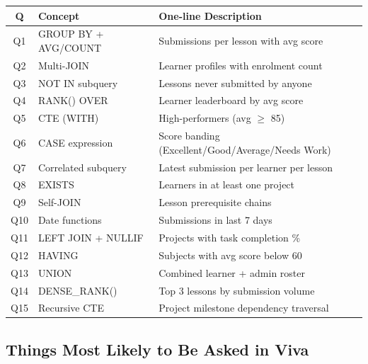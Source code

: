 \documentclass[11pt,a4paper]{article}
\begin{document}
\begin{center}
\renewcommand{\arraystretch}{1.1}
\begin{tabular}{@{}cll@{}}
\toprule
\rowcolor{tableheadbg}
{\color{white}\textbf{Q}} &
{\color{white}\textbf{Concept}} &
{\color{white}\textbf{One-line Description}} \\
\midrule
\rowcolor{tablerowbg} Q1  & GROUP BY + AVG/COUNT & Submissions per lesson with avg score \\
Q2  & Multi-JOIN          & Learner profiles with enrolment count \\
\rowcolor{tablerowbg} Q3  & NOT IN subquery     & Lessons never submitted by anyone \\
Q4  & RANK() OVER         & Learner leaderboard by avg score \\
\rowcolor{tablerowbg} Q5  & CTE (WITH)          & High-performers (avg $\geq$ 85) \\
Q6  & CASE expression     & Score banding (Excellent/Good/Average/Needs Work) \\
\rowcolor{tablerowbg} Q7  & Correlated subquery & Latest submission per learner per lesson \\
Q8  & EXISTS              & Learners in at least one project \\
\rowcolor{tablerowbg} Q9  & Self-JOIN           & Lesson prerequisite chains \\
Q10 & Date functions      & Submissions in last 7 days \\
\rowcolor{tablerowbg} Q11 & LEFT JOIN + NULLIF  & Projects with task completion \% \\
Q12 & HAVING              & Subjects with avg score below 60 \\
\rowcolor{tablerowbg} Q13 & UNION               & Combined learner + admin roster \\
Q14 & DENSE\_RANK()       & Top 3 lessons by submission volume \\
\rowcolor{tablerowbg} Q15 & Recursive CTE       & Project milestone dependency traversal \\
\bottomrule
\end{tabular}
\end{center}

\subsection{Things Most Likely to Be Asked in Viva}
\end{document}
